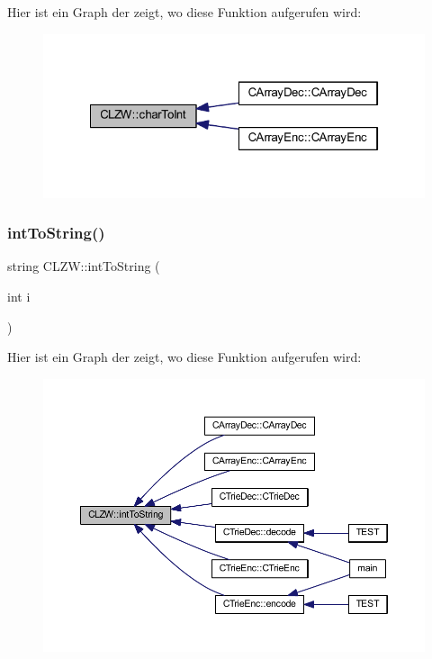 Hier ist ein Graph der zeigt, wo diese Funktion aufgerufen wird\+:
\nopagebreak
\begin{figure}[H]
\begin{center}
\leavevmode
\includegraphics[width=322pt]{class_c_l_z_w_ad7b0dd957592e723dea646d3e02771aa_icgraph}
\end{center}
\end{figure}
\mbox{\label{class_c_l_z_w_a7cd7b5a245b1b3a0eb1905d3a8e2be89}} 
\subsubsection{\texorpdfstring{int\+To\+String()}{intToString()}}
{\footnotesize\ttfamily string C\+L\+Z\+W\+::int\+To\+String (\begin{DoxyParamCaption}\item[{int}]{i }\end{DoxyParamCaption})\hspace{0.3cm}{\ttfamily [static]}}

Hier ist ein Graph der zeigt, wo diese Funktion aufgerufen wird\+:
\nopagebreak
\begin{figure}[H]
\begin{center}
\leavevmode
\includegraphics[width=350pt]{class_c_l_z_w_a7cd7b5a245b1b3a0eb1905d3a8e2be89_icgraph}
\end{center}
\end{figure}



